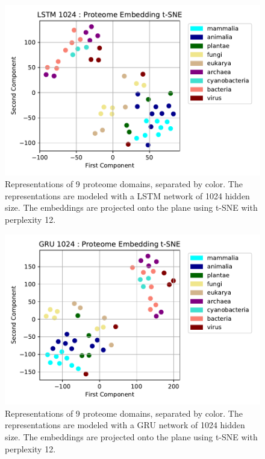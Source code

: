 \documentclass[a4paper,12pt]{article}
\begin{document}
\begin{figure}[H]
    \centering
    \includegraphics[width=0.95\linewidth]{figures/fig2b_LSTM_1024_no_trunc.pdf}
    \caption{Representations of 9 proteome domains, separated by color. The representations are modeled with a LSTM network of 1024 hidden size. The embeddings are projected onto the plane using t-SNE with perplexity 12.}
    \label{fig:fig2b_LSTM}
\end{figure}

\begin{figure}[H]
    \centering
    \includegraphics[width=0.95\linewidth]{figures/fig2b_GRU_1024_no_trunc.pdf}
    \caption{Representations of 9 proteome domains, separated by color. The representations are modeled with a GRU network of 1024 hidden size. The embeddings are projected onto the plane using t-SNE with perplexity 12.}
    \label{fig:fig2b_GRU}
\end{figure}
\end{document}
